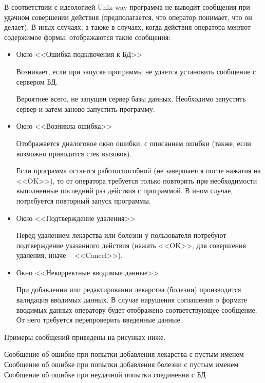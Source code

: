 В соответствии с идеологией Unix-way программа не выводит сообщения при удачном
совершении действия (предполагается, что оператор понимает, что он делает). В
иных случаях, а также в случаях, когда действия оператора меняют содержимое
формы, отображаются такие сообщения:
\begin{itemize}
    \item Окно <<Ошибка подключения к БД>>

        Возникает, если при запуске программы не удается установить сообщение с
        сервером БД.

        Вероятнее всего, не запущен сервер базы данных. Необходимо запустить
        сервер и затем заново запустить программу.

    \item Окно <<Возникла ошибка>>

        Отображается диалоговое окно ошибки, с описанием ошибки (также, если
        возможно приводится стек вызовов).

        Если программа остается работоспособной (не завершается после нажатия
        на <<OK>>), то от оператора требуется только повторить при
        необходимости выполненные последний раз действия с программой. В
        ином случае, потребуется повторный запуск программы.

    \item Окно <<Подтверждение удаления>>

        Перед удалением лекарства или болезни у пользователя потребуют
        подтверждение указанного действия (нажать <<OK>>, для совершения
        удаления, иначе -- <<Cancel>>).

    \item Окно <<Некорректные вводимые данные>>

        При добавлении или редактировании лекарства (болезни) производится
        валидация вводимых данных. В случае нарушения соглашения о формате
        вводимых данных оператору будет отображено соответствующее сообщение.
        От него требуется перепроверить введенные данные.
\end{itemize}

Примеры сообщений приведены на рисунках ниже.

{Сообщение об ошибке при попытки добавления лекарства с пустым именем}{}
{Сообщение об ошибке при попытки добавления болезни с пустым именем}{}
{Сообщение об ошибке при неудачной попытки соединения с БД}{}


\clearpage

